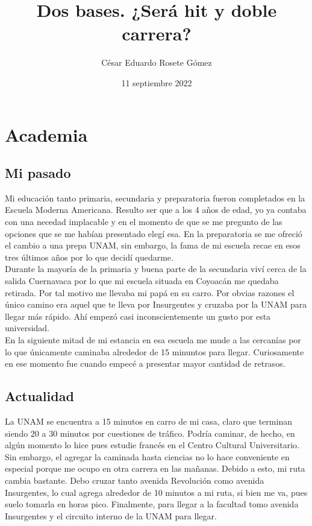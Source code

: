 \documentclass[letterpaper,12pt]{article}
\title{Dos bases. ¿Será hit y doble carrera?}
\author{César Eduardo Rosete Gómez}
\date{11 septiembre 2022}
\begin{document}
\maketitle

\section{Academia}
\subsection{Mi pasado}
{\large{Mi educación tanto primaria, secundaria y preparatoria fueron completados en la Escuela Moderna Americana.}} \tiny{Resulto ser que a los 4 años de edad, yo ya contaba con una necedad implacable y en el momento de que se me pregunto de las opciones que se me habían presentado elegí esa. En la preparatoria se me ofreció el cambio a una prepa UNAM, sin embargo, la fama de mi escuela recae en esos tres últimos años por lo que decidí quedarme.}\\
\large{Durante la mayoría de la primaria y buena parte de la secundaria viví cerca de la salida Cuernavaca por lo que mi escuela situada en Coyoacán me quedaba retirada. Por tal motivo me llevaba mi papá en su carro. Por obvias razones el único camino era aquel que te lleva por Insurgentes y cruzaba por la UNAM para llegar más rápido.} \tiny{Ahí empezó casi inconscientemente un gusto por esta universidad.}\\
\large{En la siguiente mitad de mi estancia en esa escuela me mude a las cercanías por lo que únicamente caminaba alrededor de 15 minuntos para llegar.} \tiny{Curiosamente en ese momento fue cuando empecé a presentar mayor cantidad de retrasos.}
\subsection{Actualidad }
\large{La UNAM se encuentra a 15 minutos en carro de mi casa, claro que terminan siendo 20 a 30 minutos por cuestiones de tráfico.} \tiny{Podría caminar, de hecho, en algún momento lo hice pues estudie francés en el Centro Cultural Universitario. Sin embargo, el agregar la caminada hasta ciencias no lo hace conveniente en especial porque me ocupo en otra carrera en las mañanas. Debido a esto, mi ruta cambia bastante.} \large{Debo cruzar tanto avenida Revolución como avenida Insurgentes, lo cual agrega alrededor de 10 minutos a mi ruta, si bien me va, pues suelo tomarla en horas pico. Finalmente, para llegar a la facultad tomo avenida Insurgentes y el circuito interno de la UNAM para llegar.} 
\end{document}
